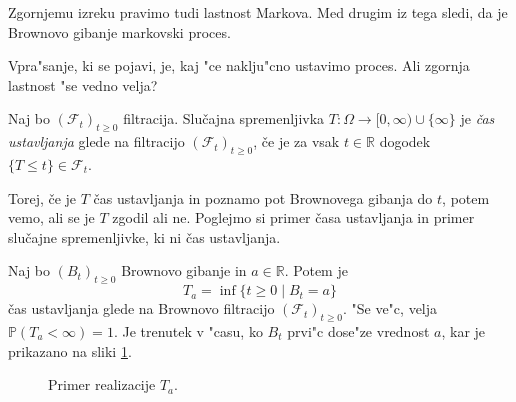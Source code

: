 \documentclass[twoside,11pt]{article}
\begin{document}
\begin{opomba}
    Zgornjemu izreku pravimo tudi lastnost Markova. Med drugim iz tega sledi, da je Brownovo gibanje markovski proces.
\end{opomba}

Vpra"sanje, ki se pojavi, je, kaj "ce naklju"cno ustavimo proces. Ali zgornja lastnost "se vedno velja?

%

\begin{definicija}
    Naj bo $(\mathcal{F}_t)_{t\geq0}$ filtracija. Slučajna spremenljivka $T: \Omega \rightarrow [0, \infty)\cup \{\infty\}$ 
    je \textit{čas ustavljanja} glede na filtracijo $(\mathcal{F}_t)_{t\geq0}$, če je za vsak $t \in \mathbb{R}$ dogodek $\{T \leq t\} \in \mathcal{F}_t$.
\end{definicija}

Torej, če je $T$ čas ustavljanja in poznamo pot Brownovega gibanja do $t$, potem vemo, 
ali se je $T$  zgodil ali ne. Poglejmo si primer časa ustavljanja in primer slučajne spremenljivke, 
ki ni čas ustavljanja.

\pagebreak
\begin{primer}
    Naj bo $(B_t)_{t\geq0}$ Brownovo gibanje in $a \in \mathbb{R}$. Potem je
    $$
        T_a = \inf\{t \geq 0 \mid B_t = a\}
    $$
    čas ustavljanja glede na Brownovo filtracijo $(\mathcal{F}_t)_{t\geq0}$. "Se ve"c, velja $\mathbb{P}(T_a < \infty) = 1$.
    Je trenutek v "casu, ko $B_t$ prvi"c dose"ze vrednost $a$,  kar je prikazano na sliki \ref{fig:slika3}.
    \label{ex:CasUst}
\end{primer}

\begin{figure}[h]
    \centering
    \caption{Primer realizacije $T_a$.}
    \label{fig:slika3}
\end{figure}
\end{document}
